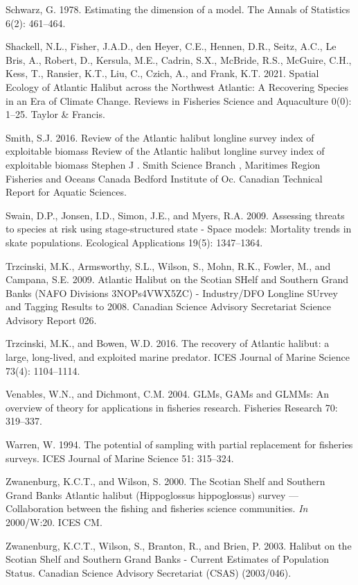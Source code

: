 \documentclass[12pt]{article}\usepackage[]{graphicx}\usepackage[]{color}
\begin{document}
\leavevmode\hypertarget{ref-Schwarz1978}{}%
Schwarz, G. 1978. Estimating the dimension of a model. The Annals of Statistics 6(2): 461--464.

\leavevmode\hypertarget{ref-Shackell2021}{}%
Shackell, N.L., Fisher, J.A.D., den Heyer, C.E., Hennen, D.R., Seitz, A.C., Le Bris, A., Robert, D., Kersula, M.E., Cadrin, S.X., McBride, R.S., McGuire, C.H., Kess, T., Ransier, K.T., Liu, C., Czich, A., and Frank, K.T. 2021. Spatial Ecology of Atlantic Halibut across the Northwest Atlantic: A Recovering Species in an Era of Climate Change. Reviews in Fisheries Science and Aquaculture 0(0): 1--25. Taylor \& Francis.

\leavevmode\hypertarget{ref-Smith2016a}{}%
Smith, S.J. 2016. Review of the Atlantic halibut longline survey index of exploitable biomass Review of the Atlantic halibut longline survey index of exploitable biomass Stephen J . Smith Science Branch , Maritimes Region Fisheries and Oceans Canada Bedford Institute of Oc. Canadian Technical Report for Aquatic Sciences.

\leavevmode\hypertarget{ref-Swain2009}{}%
Swain, D.P., Jonsen, I.D., Simon, J.E., and Myers, R.A. 2009. Assessing threats to species at risk using stage-structured state - Space models: Mortality trends in skate populations. Ecological Applications 19(5): 1347--1364.

\leavevmode\hypertarget{ref-Trzcinski2009}{}%
Trzcinski, M.K., Armsworthy, S.L., Wilson, S., Mohn, R.K., Fowler, M., and Campana, S.E. 2009. Atlantic Halibut on the Scotian SHelf and Southern Grand Banks (NAFO Divisions 3NOPs4VWX5ZC) - Industry/DFO Longline SUrvey and Tagging Results to 2008. Canadian Science Advisory Secretariat Science Advisory Report 026.

\leavevmode\hypertarget{ref-Trzcinski2016}{}%
Trzcinski, M.K., and Bowen, W.D. 2016. The recovery of Atlantic halibut: a large, long-lived, and exploited marine predator. ICES Journal of Marine Science 73(4): 1104--1114.

\leavevmode\hypertarget{ref-Venables2004}{}%
Venables, W.N., and Dichmont, C.M. 2004. GLMs, GAMs and GLMMs: An overview of theory for applications in fisheries research. Fisheries Research 70: 319--337.

\leavevmode\hypertarget{ref-Warren1994}{}%
Warren, W. 1994. The potential of sampling with partial replacement for fisheries surveys. ICES Journal of Marine Science 51: 315--324.

\leavevmode\hypertarget{ref-Zwanenburg2000}{}%
Zwanenburg, K.C.T., and Wilson, S. 2000. The Scotian Shelf and Southern Grand Banks Atlantic halibut (Hippoglossus hippoglossus) survey --- Collaboration between the fishing and fisheries science communities. \emph{In} 2000/W:20. ICES CM.

\leavevmode\hypertarget{ref-Zwanenburg2003}{}%
Zwanenburg, K.C.T., Wilson, S., Branton, R., and Brien, P. 2003. Halibut on the Scotian Shelf and Southern Grand Banks - Current Estimates of Population Status. Canadian Science Advisory Secretariat (CSAS) (2003/046).
\end{document}
